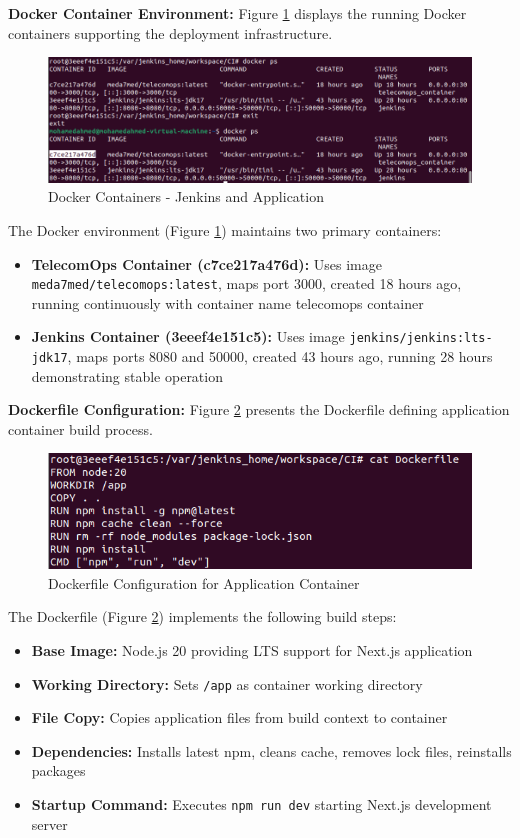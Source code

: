 \textbf{Docker Container Environment:} Figure \ref{fig:docker_containers} displays the running Docker containers supporting the deployment infrastructure.

\begin{figure}[H]
    \centering
    \includegraphics[width=0.95\linewidth]{img/chap_08/containerrunning.png}
    \caption{Docker Containers - Jenkins and Application}
    \label{fig:docker_containers}
\end{figure}

The Docker environment (Figure \ref{fig:docker_containers}) maintains two primary containers:
\begin{itemize}
\item \textbf{TelecomOps Container (c7ce217a476d):} Uses image \texttt{meda7med/telecomops:latest}, maps port 3000, created 18 hours ago, running continuously with container name telecomops container
\item \textbf{Jenkins Container (3eeef4e151c5):} Uses image \texttt{jenkins/jenkins:lts-jdk17}, maps ports 8080 and 50000, created 43 hours ago, running 28 hours demonstrating stable operation
\end{itemize}

\textbf{Dockerfile Configuration:} Figure \ref{fig:dockerfile} presents the Dockerfile defining application container build process.

\begin{figure}[H]
    \centering
    \includegraphics[width=0.8\linewidth]{img/chap_08/dockerfile.png}
    \caption{Dockerfile Configuration for Application Container}
    \label{fig:dockerfile}
\end{figure}

The Dockerfile (Figure \ref{fig:dockerfile}) implements the following build steps:
\begin{itemize}
\item \textbf{Base Image:} Node.js 20 providing LTS support for Next.js application
\item \textbf{Working Directory:} Sets \texttt{/app} as container working directory
\item \textbf{File Copy:} Copies application files from build context to container
\item \textbf{Dependencies:} Installs latest npm, cleans cache, removes lock files, reinstalls packages
\item \textbf{Startup Command:} Executes \texttt{npm run dev} starting Next.js development server
\end{itemize}

